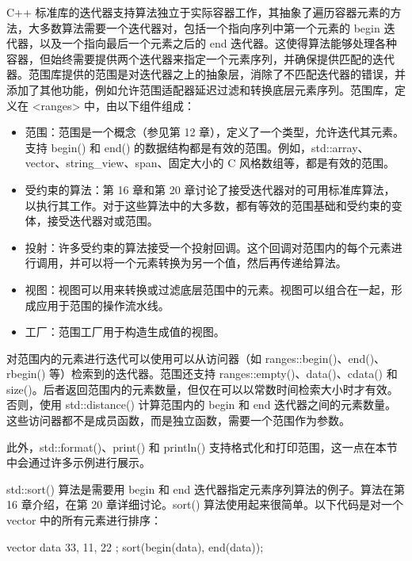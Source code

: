 

C++ 标准库的迭代器支持算法独立于实际容器工作，其抽象了遍历容器元素的方法，大多数算法需要一个迭代器对，包括一个指向序列中第一个元素的 begin 迭代器，以及一个指向最后一个元素之后的 end 迭代器。这使得算法能够处理各种容器，但始终需要提供两个迭代器来指定一个元素序列，并确保提供匹配的迭代器。范围库提供的范围是对迭代器之上的抽象层，消除了不匹配迭代器的错误，并添加了其他功能，例如允许范围适配器延迟过滤和转换底层元素序列。范围库，定义在 <ranges> 中，由以下组件组成：

\begin{itemize}
\item
范围：范围是一个概念（参见第 12 章），定义了一个类型，允许迭代其元素。支持 begin() 和 end() 的数据结构都是有效的范围。例如，std::array、vector、string\_view、span、固定大小的 C 风格数组等，都是有效的范围。

\item
受约束的算法：第 16 章和第 20 章讨论了接受迭代器对的可用标准库算法，以执行其工作。对于这些算法中的大多数，都有等效的范围基础和受约束的变体，接受迭代器对或范围。

\item
投射：许多受约束的算法接受一个投射回调。这个回调对范围内的每个元素进行调用，并可以将一个元素转换为另一个值，然后再传递给算法。

\item
视图：视图可以用来转换或过滤底层范围中的元素。视图可以组合在一起，形成应用于范围的操作流水线。

\item
工厂：范围工厂用于构造生成值的视图。
\end{itemize}

对范围内的元素进行迭代可以使用可以从访问器（如 ranges::begin()、end()、rbegin() 等）检索到的迭代器。范围还支持 ranges::empty()、data()、cdata() 和 size()。后者返回范围内的元素数量，但仅在可以以常数时间检索大小时才有效。否则，使用 std::distance() 计算范围内的 begin 和 end 迭代器之间的元素数量。这些访问器都不是成员函数，而是独立函数，需要一个范围作为参数。

此外，std::format()、print() 和 println() 支持格式化和打印范围，这一点在本节中会通过许多示例进行展示。


std::sort() 算法是需要用 begin 和 end 迭代器指定元素序列算法的例子。算法在第 16 章介绍，在第 20 章详细讨论。sort() 算法使用起来很简单。以下代码是对一个 vector 中的所有元素进行排序：

\begin{cpp}
vector data { 33, 11, 22 };
sort(begin(data), end(data));
\end{cpp}

